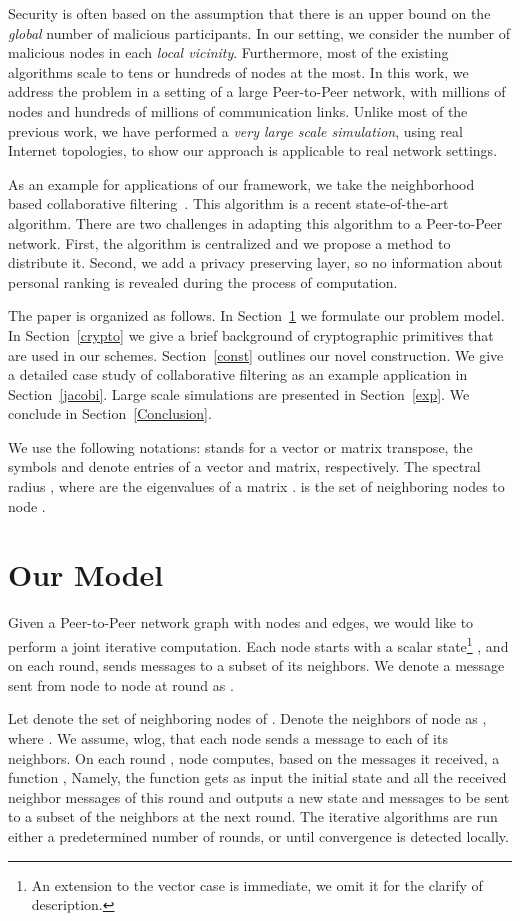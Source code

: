 \documentclass[times, 10pt,twocolumn]{article}
\begin{document}
Security is often based on the assumption that there is an upper
bound on the {\em global} number of malicious participants. In our
setting, we consider the number of malicious nodes in each {\em
local vicinity}. Furthermore, most of the existing algorithms
scale to tens or hundreds of nodes at the most. In this work, we address
the problem in a setting of a large Peer-to-Peer network, with
millions of nodes and hundreds of millions of communication links.
Unlike most of the previous work, we have performed a {\em very
large scale simulation}, using real Internet topologies, to show
our approach is applicable to real network settings.

As an example for applications of our framework, we take the
neighborhood based collaborative filtering~\cite{KorenCF}. This
algorithm is a recent state-of-the-art algorithm. There are two
challenges in adapting this algorithm to a Peer-to-Peer network.
First, the algorithm is centralized and we propose a method to
distribute it. Second, we add a privacy preserving layer, so no
information about personal ranking is revealed during the process
of computation.

 The paper is organized as follows. In Section~\ref{model} we
formulate our problem model. In Section~\ref{crypto} we give a
brief background of cryptographic primitives that are used in our
schemes. Section~\ref{const} outlines our novel construction. We
give a detailed case study of collaborative filtering as an
example application in Section~\ref{jacobi}. Large scale
simulations are presented in Section~\ref{exp}. We conclude in
Section~\ref{Conclusion}.

We use the following notations:  stands for a vector or matrix
transpose, the symbols  and  denote
entries of a vector and matrix, respectively. The spectral radius
, where
 are the eigenvalues of a matrix
.  is the set of neighboring nodes to node .

\section{Our Model}
\label{model} Given a Peer-to-Peer network graph  with
 nodes and  edges, we would like to perform a
joint iterative computation. Each node  starts with a scalar
state\footnote{An extension to the vector case is immediate, we
omit it for the clarify of description.} ,
and on each round, sends messages to a subset of its neighbors. We
denote a message sent from node  to node  at round  as
.

Let  denote the set of neighboring nodes of .  Denote the
neighbors of node  as , where
.  We assume, wlog, that each node sends a message to each of
its neighbors.  On each round , node  computes,
based on the messages it received, a function , 
Namely, the function gets as input the initial state and all the
received neighbor messages of this round and outputs a new state and
messages to be sent to a subset of the neighbors at the next
round. The iterative algorithms are run either a predetermined number
of rounds, or until convergence is detected locally.
\end{document}
